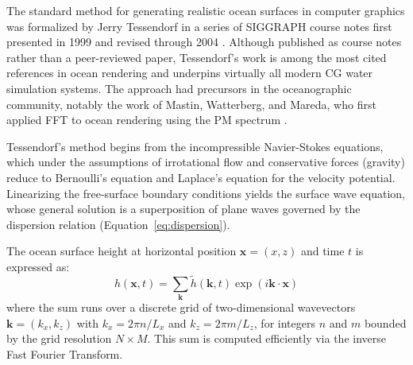     The standard method for generating realistic ocean surfaces in computer graphics was formalized by Jerry Tessendorf in a series of SIGGRAPH course notes first presented in 1999 and revised through 2004 \cite{Tessendorf2004}. Although published as course notes rather than a peer-reviewed paper, Tessendorf's work is among the most cited references in ocean rendering and underpins virtually all modern CG water simulation systems. The approach had precursors in the oceanographic community, notably the work of Mastin, Watterberg, and Mareda, who first applied FFT to ocean rendering using the PM spectrum \cite{Mastin1987}.

    Tessendorf's method begins from the incompressible Navier-Stokes equations, which under the assumptions of irrotational flow and conservative forces (gravity) reduce to Bernoulli's equation and Laplace's equation for the velocity potential. Linearizing the free-surface boundary conditions yields the surface wave equation, whose general solution is a superposition of plane waves governed by the dispersion relation (Equation~\ref{eq:dispersion}).

    The ocean surface height at horizontal position $\mathbf{x} = (x, z)$ and time $t$ is expressed as:
    \begin{equation}
        h(\mathbf{x}, t) = \sum_{\mathbf{k}} \tilde{h}(\mathbf{k}, t) \exp(i\mathbf{k} \cdot \mathbf{x})
        \label{eq:fft_height}
    \end{equation}
    where the sum runs over a discrete grid of two-dimensional wavevectors $\mathbf{k} = (k_x, k_z)$ with $k_x = 2\pi n / L_x$ and $k_z = 2\pi m / L_z$, for integers $n$ and $m$ bounded by the grid resolution $N \times M$. This sum is computed efficiently via the inverse Fast Fourier Transform.

